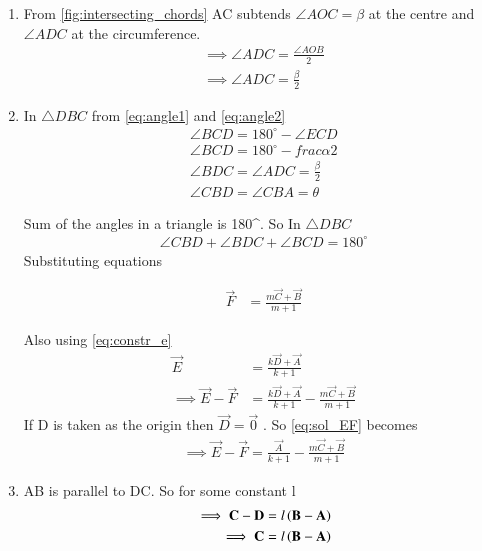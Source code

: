 \begin{enumerate}[label=\thesection.\arabic*.,ref=\thesection.\theenumi]
\item From \ref{fig:intersecting_chords} AC subtends $\angle AOC = \beta$ at the centre and $\angle ADC$ at the circumference.
\begin{align}
\implies \angle ADC = \frac{\angle AOB}{2}
\\
\implies \angle ADC = \frac{\beta}{2}
\label{eq:angle2}
\end{align}


\item In $\triangle DBC$ from \ref{eq:angle1} and \ref{eq:angle2}
\begin{align}
\angle BCD = 180^{\circ} - \angle ECD
\\
\angle BCD = 180^{\circ} - frac{\alpha}{2}
\label{eq:tri1}
\\
\angle BDC = \angle ADC = \frac{\beta}{2}
\label{eq:tri2}
\\
\angle CBD = \angle CBA = \theta
\label{eq:tri3}
\end{align}

Sum of the angles in a triangle is 180^{\circ}. So In $\triangle DBC$
\begin{align}
\angle CBD + \angle BDC + \angle BCD = 180^{\circ}
\label{eq:trisum}
\end{align}
Substituting equations 


\begin{align}
\vec{F} &= \frac{{{m\vec{C}} +\vec{B}}}{m+1}
\end{align}

%
Also using \ref{eq:constr_e}
\begin{align}
\vec{E} &= \frac{{{k\vec{D}} +\vec{A}}}{k+1}
\\
\implies \vec{E} - \vec{F} &= \frac{{{k\vec{D}} +\vec{A}}}{k+1}-\frac{{{m\vec{C}} +\vec{B}}}{m+1}
\label{eq:sol_EF}
\end{align}
If D is taken as the origin then $\vec{D} = \vec{0}$ . So \ref{eq:sol_EF} becomes
\begin{align}
\implies \vec{E} - \vec{F} = \frac{\vec{A}}{k+1}-\frac{{{m\vec{C}} +\vec{B}}}{m+1}
\label{eq:sol_EF2}
\end{align}

\item AB is parallel to DC. So for some constant l
\begin{align}
\implies \mathbf{C}-\mathbf{D} &= l\left(\mathbf{B}-\mathbf{A}\right)
\\
\implies \mathbf{C} &= l\left(\mathbf{B}-\mathbf{A}\right)
\label{eq:sol_C}
\end{align}


\end{enumerate}
